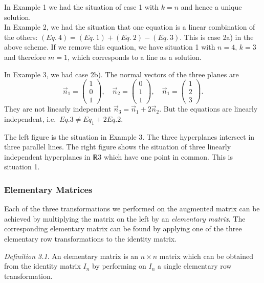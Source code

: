 \documentclass[
  letterpaper,
  DIV=11,
  numbers=noendperiod]{scrartcl}
\theoremstyle{remark}
\begin{document}
In Example 1 we had the situation of case 1 with \(k=n\) and hence a
unique solution.\\
In Example 2, we had the situation that one equation is a linear
combination of the others: \((Eq.~4) = (Eq.~1)+(Eq.~2) - (Eq.~3)\). This
is case 2a) in the above scheme. If we remove this equation, we have
situation 1 with \(n=4\), \(k=3\) and therefore \(m=1\), which
corresponds to a line as a solution.

In Example 3, we had case 2b). The normal vectors of the three planes
are
\[\vec{n}_{1} = \scriptscriptstyle \begin{pmatrix}   1 \\ 0 \\ 1  \end{pmatrix} \textstyle, \quad \vec{n}_{2} = \scriptscriptstyle \begin{pmatrix}   0 \\ 1 \\ 1  \end{pmatrix} \textstyle, \quad \vec{n}_{1} = \scriptscriptstyle \begin{pmatrix}   1 \\ 2 \\ 3  \end{pmatrix} \textstyle .\]
They are not linearly independent
\(\vec{n}_{3} = \vec{n}_{1} +2 \vec{n}_{2}\). But the equations are
linearly independent, i.e.~\(Eq. 3 \neq Eq_{1} + 2 Eq. 2\).

The left figure is the situation in Example 3. The three hyperplanes
intersect in three parallel lines. The right figure shows the situation
of three linearly independent hyperplanes in {ℝ3} which have one point
in common. This is situation 1.

\subsubsection{Elementary Matrices}\label{elementary-matrices}

Each of the three transformations we performed on the augmented matrix
can be achieved by multiplying the matrix on the left by an
\emph{elementary matrix}. The corresponding elementary matrix can be
found by applying one of the three elementary row transformations to the
identity matrix.

\emph{Definition 3.1}. An elementary matrix is an \(n\times n\) matrix
which can be obtained from the identity matrix \(I_{n}\) by performing
on \(I_{n}\) a single elementary row transformation.
\end{document}
